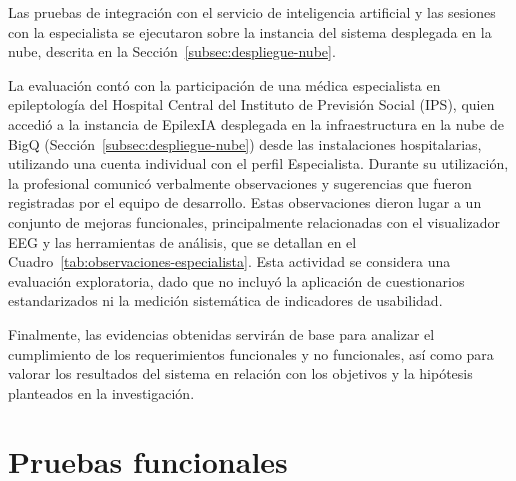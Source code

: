 Las pruebas de integración con el servicio de inteligencia artificial y las sesiones con la especialista se ejecutaron sobre la instancia del sistema desplegada en la nube, descrita en la Sección~\ref{subsec:despliegue-nube}.

La evaluación contó con la participación de una médica especialista en epileptología del Hospital Central del Instituto de Previsión Social (IPS), quien accedió a la instancia de EpilexIA desplegada en la infraestructura en la nube de BigQ (Sección~\ref{subsec:despliegue-nube}) desde las instalaciones hospitalarias, utilizando una cuenta individual con el perfil Especialista. Durante su utilización, la profesional comunicó verbalmente observaciones y sugerencias que fueron registradas por el equipo de desarrollo. Estas observaciones dieron lugar a un conjunto de mejoras funcionales, principalmente relacionadas con el visualizador EEG y las herramientas de análisis, que se detallan en el Cuadro~\ref{tab:observaciones-especialista}. Esta actividad se considera una evaluación exploratoria, dado que no incluyó la aplicación de cuestionarios estandarizados ni la medición sistemática de indicadores de usabilidad.

Finalmente, las evidencias obtenidas servirán de base para analizar el cumplimiento de los requerimientos funcionales y no funcionales, así como para valorar los resultados del sistema en relación con los objetivos y la hipótesis planteados en la investigación.

\section{Pruebas funcionales}
\label{sec:pruebas_funcionales}

